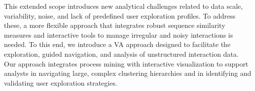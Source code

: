 \documentclass[preprint,journal]{vgtc}            %
\begin{document}
This extended scope introduces new analytical challenges related to data scale, variability, noise, and lack of predefined user exploration profiles.
To address these, a more flexible approach that integrates robust sequence similarity measures and interactive tools to manage irregular and noisy interactions is needed.
To this end, we introduce a VA approach designed to facilitate the exploration, guided navigation, and analysis of unstructured interaction data.
Our approach integrates process mining with interactive visualization to support analysts in navigating large, complex clustering hierarchies and in identifying and validating user exploration strategies.
\end{document}
